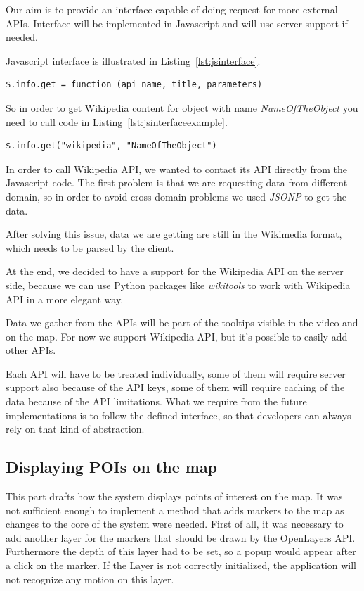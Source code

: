 \documentclass[journal]{IEEEtran}
\begin{document}
Our aim is to provide an interface capable of doing request for more external APIs. Interface will be implemented in Javascript and will use server support if needed.

Javascript interface is illustrated in Listing~\ref{lst:jsinterface}.

\begin{lstlisting}[caption={Javascript~interface~for~connecting~external~API},label={lst:jsinterface}]
$.info.get = function (api_name, title,	parameters)
\end{lstlisting}

So in order to get Wikipedia content for object with name \textit{NameOfTheObject} you need to call code in Listing~\ref{lst:jsinterfaceexample}.

\begin{lstlisting}[caption={Getting Wikipedia content},label={lst:jsinterfaceexample}]
$.info.get("wikipedia", "NameOfTheObject")
\end{lstlisting}

In order to call Wikipedia API, we wanted to contact its API directly from the Javascript code. The first problem is that we are requesting data from different domain, so in order to avoid cross-domain problems we used \textit{JSONP} to get the data.

After solving this issue, data we are getting are still in the Wikimedia format, which needs to be parsed by the client.

At the end, we decided to have a support for the Wikipedia API on the server side, because we can use Python packages like \textit{wikitools} to work with Wikipedia API in a more elegant way.

Data we gather from the APIs will be part of the tooltips visible in the video and on the map. For now we support Wikipedia API, but it's possible to easily add other APIs.

Each API will have to be treated individually, some of them will require server support also because of the API keys, some of them will require caching of the data because of the API limitations. What we require from the future implementations is to follow the defined interface, so that developers can always rely on that kind of abstraction.

\subsection{Displaying POIs on the map}

This part drafts how the system displays points of interest on the map. It was not sufficient enough to implement a method that adds markers to the map as changes to the core of the system were needed. First of all, it was necessary to add another layer for the markers that should be drawn by the OpenLayers API. Furthermore the depth of this layer had to be set, so a popup would appear after a click on the marker. If the Layer is not correctly initialized, the application will not recognize any motion on this layer.
\end{document}
